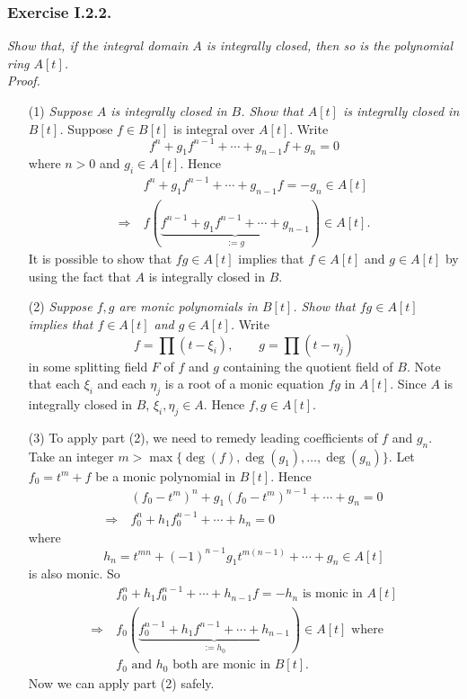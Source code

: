 \documentclass{article}
\begin{document}



\subsubsection*{Exercise I.2.2.}
\emph{Show that, if the integral domain $A$ is integrally closed,
then so is the polynomial ring $A[t]$.} \\



\emph{Proof.}
\begin{enumerate}
\item[(1)]
  \emph{Suppose $A$ is integrally closed in $B$.
  Show that $A[t]$ is integrally closed in $B[t]$.}
  Suppose $f \in B[t]$ is integral over $A[t]$.
  Write
  \[
    f^n + g_1 f^{n-1} + \cdots + g_{n-1} f + g_n = 0 
  \]
  where $n > 0$ and $g_i \in A[t]$.
  Hence
  \begin{align*}
    &\:
    f^n + g_1 f^{n-1} + \cdots + g_{n-1} f = -g_n \in A[t] \\
    \Longrightarrow &\:
    f(\underbrace{f^{n-1} + g_1 f^{n-1} + \cdots + g_{n-1}}_{:= g}) \in A[t].
  \end{align*}
  It is possible to show that $fg \in A[t]$ implies that $f \in A[t]$ and $g \in A[t]$
  by using the fact that $A$ is integrally closed in $B$.

\item[(2)]
  \emph{Suppose $f, g$ are monic polynomials in $B[t]$.
  Show that $fg \in A[t]$ implies that $f \in A[t]$ and $g \in A[t]$.}
  Write
  \[
    f = \prod (t - \xi_i),
    \qquad
    g = \prod (t - \eta_j)
  \]
  in some splitting field $F$ of $f$ and $g$ containing the quotient field of $B$.
  Note that each $\xi_i$ and each $\eta_j$ is a root of a monic equation $fg$ in $A[t]$.
  Since $A$ is integrally closed in $B$, $\xi_i, \eta_j \in A$.
  Hence $f, g \in A[t]$.

\item[(3)]
  To apply part (2), we need to remedy leading coefficients of $f$ and $g_n$.
  Take an integer $m > \max\{\deg(f), \deg(g_1), \ldots, \deg(g_n) \}$.
  Let $f_0 = t^m + f$ be a monic polynomial in $B[t]$.
  Hence
  \begin{align*}
    &\:
    (f_0 - t^m)^n + g_1 (f_0 - t^m)^{n-1} + \cdots + g_n = 0 \\
    \Longrightarrow &\:
    f_0^n + h_1 f_0^{n-1} + \cdots + h_n = 0
  \end{align*}
  where
  \[
    h_n = t^{mn} + (-1)^{n-1} g_1 t^{m(n-1)} + \cdots + g_n \in A[t]
  \]
  is also monic.
  So
  \begin{align*}
    &\:
    f_0^n + h_1 f_0^{n-1} + \cdots + h_{n-1} f = -h_n \text{ is monic in } A[t] \\
    \Longrightarrow &\:
    f_0(\underbrace{f_0^{n-1} + h_1 f^{n-1} + \cdots + h_{n-1}}_{:= h_0}) \in A[t] \text{ where } \\
    &\: \text{$f_0$ and $h_0$ both are monic in } B[t].
  \end{align*}
  Now we can apply part (2) safely.


\end{enumerate}
\end{document}

